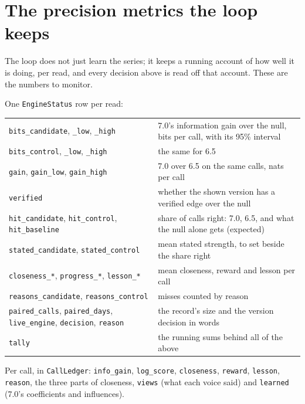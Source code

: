 \documentclass[10.5pt]{article}
\begin{document}
\section{The precision metrics the loop keeps}
\begin{plain}
The loop does not just learn the series; it keeps a running account of how well it is doing, per read, and every decision above is read off that account. These are the numbers to monitor.
\end{plain}
One \texttt{EngineStatus} row per read:
\begin{center}\small\begin{tabular}{@{}p{5.6cm}p{9.4cm}@{}}\toprule
\texttt{bits\_candidate}, \texttt{\_low}, \texttt{\_high} & 7.0's information gain over the null, bits per call, with its 95\% interval\\
\texttt{bits\_control}, \texttt{\_low}, \texttt{\_high} & the same for 6.5\\
\texttt{gain}, \texttt{gain\_low}, \texttt{gain\_high} & 7.0 over 6.5 on the same calls, nats per call\\
\texttt{verified} & whether the shown version has a verified edge over the null\\
\texttt{hit\_candidate}, \texttt{hit\_control}, \texttt{hit\_baseline} & share of calls right: 7.0, 6.5, and what the null alone gets (expected)\\
\texttt{stated\_candidate}, \texttt{stated\_control} & mean stated strength, to set beside the share right\\
\texttt{closeness\_*}, \texttt{progress\_*}, \texttt{lesson\_*} & mean closeness, reward and lesson per call\\
\texttt{reasons\_candidate}, \texttt{reasons\_control} & misses counted by reason\\
\texttt{paired\_calls}, \texttt{paired\_days}, \texttt{live\_engine}, \texttt{decision}, \texttt{reason} & the record's size and the version decision in words\\
\texttt{tally} & the running sums behind all of the above\\\bottomrule\end{tabular}\end{center}
Per call, in \texttt{CallLedger}: \texttt{info\_gain}, \texttt{log\_score}, \texttt{closeness}, \texttt{reward}, \texttt{lesson}, \texttt{reason}, the three parts of closeness, \texttt{views} (what each voice said) and \texttt{learned} (7.0's coefficients and influences).
\end{document}
